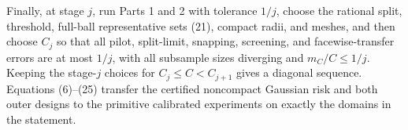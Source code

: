 Finally, at stage \(j\), run Parts 1 and 2 with tolerance \(1/j\), choose the rational split, threshold, full-ball representative sets (21), compact radii, and meshes, and then choose \(C_j\) so that all pilot, split-limit, snapping, screening, and facewise-transfer errors are at most \(1/j\), with all subsample sizes diverging and \(m_C/C\leq1/j\).  Keeping the stage-\(j\) choices for \(C_j\leq C<C_{j+1}\) gives a diagonal sequence.  Equations (6)--(25) transfer the certified noncompact Gaussian risk and both outer designs to the primitive calibrated experiments on exactly the domains in the statement.